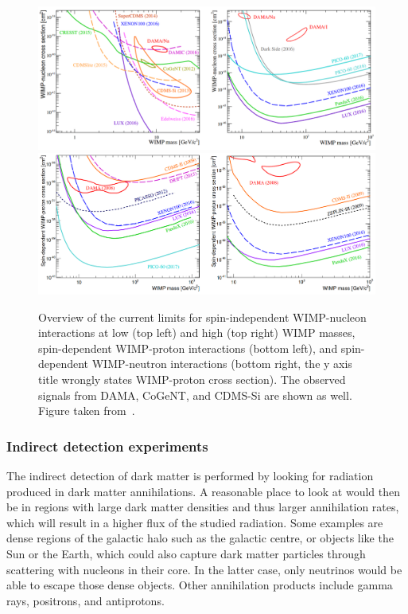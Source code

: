 \begin{figure}[ht]
  \centering
  \includegraphics[width=\textwidth]{spinindependent.png}\\
  \includegraphics[width=\textwidth]{spindependent.png}\hfill%
  \caption{Overview of the current limits for spin-independent \ac{WIMP}-nucleon interactions at low (top left) and high (top right) \ac{WIMP} masses, spin-dependent \ac{WIMP}-proton interactions (bottom left), and spin-dependent \ac{WIMP}-neutron interactions (bottom right, the y axis title wrongly states \ac{WIMP}-proton cross section). The observed signals from DAMA, CoGeNT, and CDMS-Si are shown as well. Figure taken from~\cite{Undagoitia:2015gya}.}
  \label{fig:direct_detection}
\end{figure}

\subsubsection{Indirect detection experiments}

The indirect detection of dark matter is performed by looking for radiation produced in dark matter annihilations. A reasonable place to look at would then be in regions with large dark matter densities and thus larger annihilation rates, which will result in a higher flux of the studied radiation. Some examples are dense regions of the galactic halo such as the galactic centre, or objects like the Sun or the Earth, which could also capture dark matter particles through scattering with nucleons in their core. In the latter case, only neutrinos would be able to escape those dense objects. Other annihilation products include gamma rays, positrons, and antiprotons.

